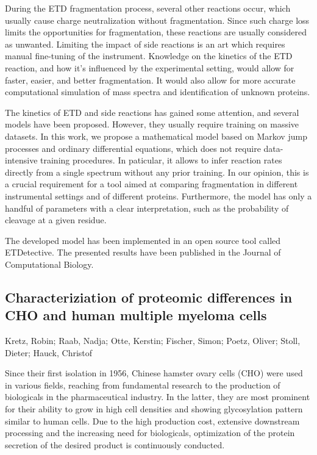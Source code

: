 {During the ETD fragmentation process, several other reactions occur, which usually cause charge neutralization without fragmentation. Since such charge loss limits the opportunities for fragmentation, these reactions are usually considered as unwanted. Limiting the impact of side reactions is an art which requires manual fine-tuning of the instrument. Knowledge on the kinetics of the ETD reaction, and how it's influenced by the experimental setting, would allow for faster, easier, and better fragmentation. It would also allow for more accurate computational simulation of mass spectra and identification of unknown proteins.

The kinetics of ETD and side reactions has gained some attention, and several models have been proposed. However, they usually require training on massive datasets. In this work, we propose a mathematical model based on Markov jump processes and ordinary differential equations, which does not require data-intensive training procedures. In paticular, it allows to infer reaction rates directly from a single spectrum without any prior training. In our opinion, this is a crucial requirement for a tool aimed at comparing fragmentation in different instrumental settings and of different proteins. Furthermore, the model has only a handful of parameters with a clear interpretation, such as the probability of cleavage at a given residue.

The developed model has been implemented in an open source tool called ETDetective. The presented results have been published in the Journal of Computational Biology.
 

\subsection*{\color{eubicRed} Characteriziation of proteomic differences in CHO and human multiple myeloma cells}
{\color{eubicGray}Kretz, Robin;
Raab, Nadja;
Otte, Kerstin;
Fischer, Simon;
Poetz, Oliver;
Stoll, Dieter;
Hauck, Christof}

Since their first isolation in 1956, Chinese hamster ovary cells (CHO) were used in various fields, reaching from fundamental research to the production of biologicals in the pharmaceutical industry. In the latter, they are most prominent for their ability to grow in high cell densities and showing glycosylation pattern similar to human cells. Due to the high production cost, extensive downstream processing and the increasing need for biologicals, optimization of the protein secretion of the desired product is continuously conducted.

}
